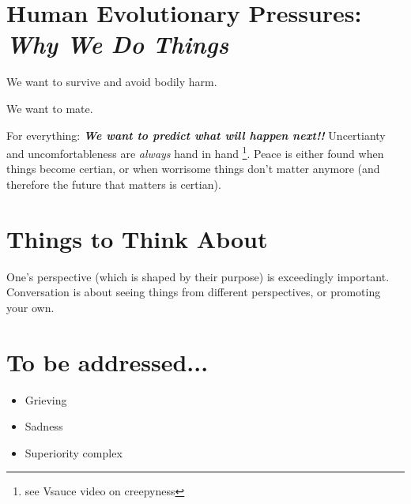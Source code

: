 \documentclass{amsart}
\begin{document}
\section{Human Evolutionary Pressures: \emph{Why We Do Things}}

We want to survive and avoid bodily harm.  
\par
We want to mate.
\par
For everything: \textbf{\emph{We want to predict what will happen next!!}}  Uncertianty and uncomfortableness are \emph{always} hand in hand \footnote{see Vsauce video on creepyness}.  Peace is either found when things become certian, or when worrisome things don't matter anymore (and therefore the future that matters is certian).  

\section{Things to Think About}

One's perspective (which is shaped by their purpose) is exceedingly important.  Conversation is about seeing things from different perspectives, or promoting your own.  

\section{To be addressed...}

\begin{itemize}
\item Grieving
\item Sadness
\item Superiority complex
\end{itemize}
\end{document}
